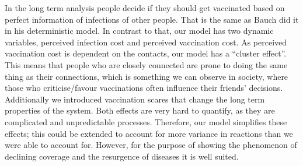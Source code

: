 \documentclass[11pt]{article}
\begin{document}
In the long term analysis people decide if they should get vaccinated based on perfect information of infections of other people. That is the same as Bauch did it in his deterministic model. In contrast to that, our model has two dynamic variables, perceived infection cost and perceived vaccination cost. As perceived vaccination cost is dependent on the contacts, our model has a “cluster effect”. This means that people who are closely connected are prone to doing the same thing as their connections, which is something we can observe in society, where those who criticise/favour vaccinations often influence their friends' decisions. Additionally we introduced vaccination scares that change the long term properties of the system. Both effects are very hard to quantify, as they are complicated and unpredictable processes. Therefore, our model simplifies these effects; this could be extended to account for more variance in reactions than we were able to account for. However, for the purpose of showing the phenomenon of declining coverage and the resurgence of diseases it is well suited. 
 
\end{document}
